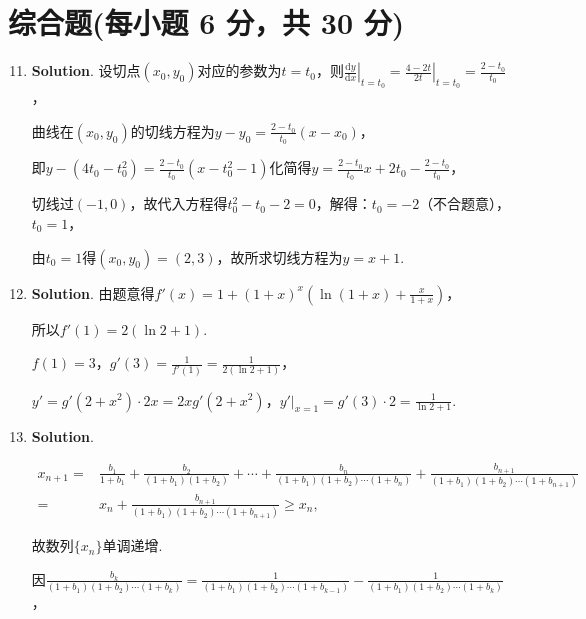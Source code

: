 \documentclass[../Main.tex]{subfiles}
\begin{document}
\section{综合题(每小题 6 分，共 30 分)}
\begin{enumerate}
    \setcounter{enumi}{10}
    \item \textbf{Solution}. 设切点$(x_{0},y_{0})$对应的参数为$t=t_{0}$，则$\left
              .\frac{\mathrm{d}y}{\mathrm{d}x}\right|_{t=t_0}=\left.\frac{4-2t}{2t}\right
              |_{t=t_0}=\frac{2-t_{0}}{t_{0}}$，

          曲线在$(x_{0},y_{0})$的切线方程为$y-y_{0}=\frac{2-t_{0}}{t_{0}}(x-x_{0})$，

          即$y-(4t_{0}-t_{0}^{2})=\frac{2-t_{0}}{t_{0}}(x-t_{0}^{2}-1)$化简得$y=\frac{2-t_{0}}{t_{0}}
              x+2t_{0}-\frac{2-t_{0}}{t_{0}}$，

          切线过$(-1,0)$，故代入方程得$t_{0}^{2}-t_{0}-2=0$，解得：$t_{0}=-2$（不合题意），$t
                  _{0}=1$，

          由$t_{0}=1$得$(x_{0},y_{0})=(2,3)$，故所求切线方程为$y=x+1$.

    \item \textbf{Solution}. 由题意得$f'(x)=1+(1+x)^{x}\left(\ln(1+x)+\frac{x}{1+x}
              \right)$，

          所以$f'(1)=2(\ln2+1)$.

          $f(1)=3$，$g'(3)=\frac{1}{f'(1)}=\frac{1}{2(\ln2+1)}$，

          $y'=g'(2+x^{2})\cdot 2x=2xg'(2+x^{2})$，$\left.y'\right|_{x=1}=g'(3)\cdot2=
              \frac{1}{\ln2+1}$.

    \item \textbf{Solution}.

          \[
              \begin{aligned}
                  x_{n+1}= & \frac{b_1}{1+b_1}+\frac{b_2}{(1+b_1)(1+b_2)}+\cdots+\frac{b_n}{(1+b_1)(1+b_2)\cdots(1+b_n)}+\frac{b_{n+1}}{(1+b_1)(1+b_2)\cdots(1+b_{n+1})} \\
                  =        & x_{n}+\frac{b_{n+1}}{(1+b_1)(1+b_2)\cdots(1+b_{n+1})}\geq x_{n},
              \end{aligned}
          \]

          故数列$\{x_{n}\}$单调递增.

          因$\frac{b_{k}}{(1+b_{1})(1+b_{2})\cdots(1+b_{k})}=\frac{1}{(1+b_{1})(1+b_{2})\cdots(1+b_{k-1})}
              -\frac{1}{(1+b_{1})(1+b_{2})\cdots(1+b_{k})}$，


\end{enumerate}
\end{document}

